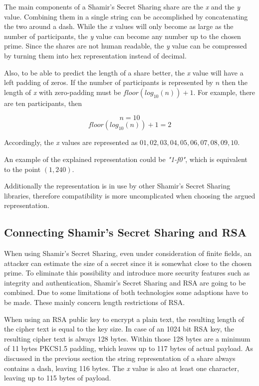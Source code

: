 The main components of a Shamir's Secret Sharing share are the \textit{x} and
the \textit{y} value. Combining them in a single string can be accomplished by
concatenating the two around a dash. While the \textit{x} values will only
become as large as the number of participants, the \textit{y} value can become
any number up to the chosen prime. Since the shares are not human readable,
the \textit{y} value can be compressed by turning them into hex representation
instead of decimal.

Also, to be able to predict the length of a share better, the \textit{x} value
will have a left padding of zeros. If the number of participants is represented
by $n$ then the length of \textit{x} with zero-padding must be
$floor(log_{10}(n))+1$. For example, there are ten participants, then

$$n = 10$$
$$floor(log_{10}(n))+1 = 2$$

Accordingly, the \textit{x} values are represented as $01, 02, 03, 04, 05, 06,
07, 08, 09, 10$.

An example of the explained representation could be \textit{"1-f0"}, which is
equivalent to the point $(1, 240)$.

Additionally the representation is in use by other Shamir's Secret Sharing
libraries, therefore compatibility is more uncomplicated when choosing the
argued representation.

\subsection{Connecting Shamir's Secret Sharing and RSA}

When using Shamir's Secret Sharing, even under consideration of finite fields,
an attacker can estimate the size of a secret since it is somewhat close to the
chosen prime. To eliminate this possibility and introduce more security
features such as integrity and authentication, Shamir's Secret Sharing and RSA
are going to be combined. Due to some limitations of both technologies some
adaptions have to be made. These mainly concern length restrictions of RSA.

When using an RSA public key to encrypt a plain text, the resulting length of
the cipher text is equal to the key size. In case of an 1024 bit RSA key, the
resulting cipher text is always 128 bytes. Within those 128 bytes are a minimum
of 11 bytes PKCS1.5 padding, which leaves up to 117 bytes of actual payload. As
discussed in the previous section the string representation of a share always
contains a dash, leaving 116 bytes. The \textit{x} value is also at least one
character, leaving up to 115 bytes of payload.

